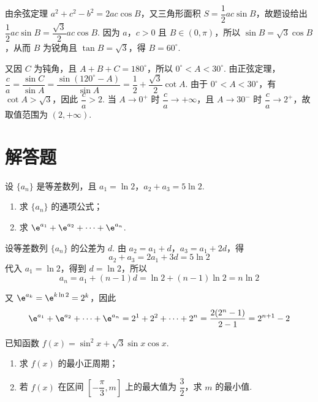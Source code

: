 \begin{solution}
由余弦定理 \(a^2+c^2-b^2=2ac\cos B\)，又三角形面积 \(S=\dfrac12ac\sin B\)，故题设给出 \(\dfrac12ac\sin B=\dfrac{\sqrt3}{2}ac\cos B\). 因为 \(a\)，\(c>0\) 且 \(B\in(0,\pi)\)，所以 \(\sin B=\sqrt3\cos B\)，从而 \(B\) 为锐角且 \(\tan B=\sqrt3\)，得 \(B=60^\circ\).

又因 \(C\) 为钝角，且 \(A+B+C=180^\circ\)，所以 \(0^\circ<A<30^\circ\). 由正弦定理，\(\dfrac ca=\dfrac{\sin C}{\sin A}=\dfrac{\sin(120^\circ-A)}{\sin A}=\dfrac12+\dfrac{\sqrt3}{2}\cot A\). 由于 \(0^\circ<A<30^\circ\)，有 \(\cot A>\sqrt3\)，因此 \(\dfrac ca>2\). 当 \(A\to0^+\) 时 \(\dfrac ca\to+\infty\)，且 \(A\to30^-\) 时 \(\dfrac ca\to2^+\)，故取值范围为 \((2,+\infty)\).
\end{solution}

\section{解答题}

\begin{problem}

设 \(\{a_n\}\) 是等差数列，且 \(a_1=\ln2\)，\(a_2+a_3=5\ln2\).

\begin{enumerate}
\item 求 \(\{a_n\}\) 的通项公式；
\item 求 \(\e^{a_1}+\e^{a_2}+\cdots+\e^{a_n}\).
\end{enumerate}
\end{problem}

\begin{solution}
设等差数列 \(\{a_n\}\) 的公差为 \(d\). 由 \(a_2=a_1+d\)，\(a_3=a_1+2d\)，得
\[
a_2+a_3=2a_1+3d=5\ln2
\]
代入 \(a_1=\ln2\)，得到 \(d=\ln2\)，所以
\[
a_n=a_1+(n-1)d=\ln2+(n-1)\ln2=n\ln2
\]

又 \(\e^{a_k}=\e^{k\ln2}=2^k\)，因此
\[
\e^{a_1}+\e^{a_2}+\cdots+\e^{a_n}=2^1+2^2+\cdots+2^n=\frac{2(2^n-1)}{2-1}=2^{n+1}-2
\]
\end{solution}


\begin{problem}

已知函数 \(f(x)=\sin^2x+\sqrt3\sin x\cos x\).

\begin{enumerate}
\item 求 \(f(x)\) 的最小正周期；
\item 若 \(f(x)\) 在区间 \(\left[-\dfrac\pi3,m\right]\) 上的最大值为 \(\dfrac32\)，求 \(m\) 的最小值.
\end{enumerate}
\end{problem}

